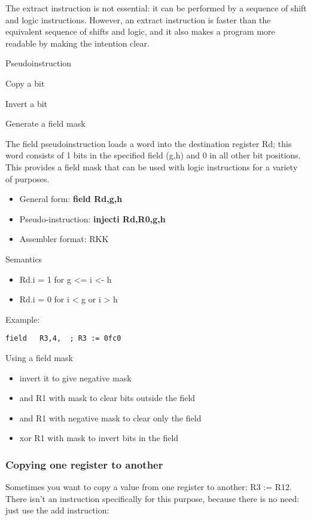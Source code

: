 \documentclass[11pt]{article}
\begin{document}
The extract instruction is not essential: it can be performed by a
sequence of shift and logic instructions.  However, an extract
instruction is faster than the equivalent sequence of shifts and
logic, and it also makes a program more readable by making the
intention clear.


Pseudoinstruction

Copy a bit

Invert a bit

Generate a field mask

The field pseudoinstruction loads a word into the destination register
Rd; this word consists of 1 bits in the specified field (g,h) and 0 in
all other bit positions.  This provides a field mask that can be used
with logic instructions for a variety of purposes.

\begin{itemize}
\item General form: \textbf{field Rd,g,h}
\item Pseudo-instruction:  \textbf{injecti Rd,R0,g,h}
\item Assembler format: RKK
\end{itemize}

Semantics
\begin{itemize}
\item Rd.i = 1 for g <= i <- h
\item Rd.i = 0 for i < g or i > h
\end{itemize}

Example:

\begin{verbatim}
field   R3,4,  ; R3 := 0fc0
\end{verbatim}

Using a field mask
\begin{itemize}
\item invert it to give negative mask
\item and R1 with mask to clear bits outside the field
\item and R1 with negative mask to clear only the field
\item xor R1 with mask to invert bits in the field
\end{itemize}

\subsubsection*{Copying one register to another}
\label{sec:orgb334c80}

Sometimes you want to copy a value from one register to another: R3 :=
R12.  There isn't an instruction specifically for this purpose,
because there is no need: just use the add instruction:
\end{document}
